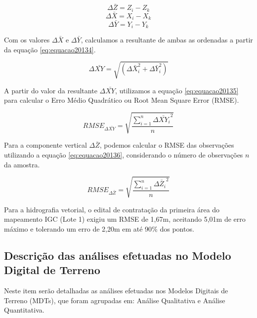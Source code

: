 \documentclass[12pt,a4paper]{article}
\begin{document}
		\begin{equation}
		\Delta  \bar{Z}=Z_{i}-Z_{k}
		\label{eq:equacao20131}
		\end{equation}
		\begin{equation}
		\Delta  \bar{X}=X_{i}-X_{k}
		\label{eq:equacao20132}
		\end{equation}
		\begin{equation}
		\Delta  \bar{Y}=Y_{i}-Y_{k}
		\label{eq:equacao20133}
		\end{equation}
		
		Com os valores $\Delta  \bar{X}$ e $\Delta  \bar{Y}$, calculamos a resultante de ambas as ordenadas a partir da equação \ref{eq:equacao20134}.
		
		
		\begin{equation}
		\Delta\bar{XY} =\sqrt {(\Delta  \bar X_{i}^2+ \Delta  \bar Y_{i}^2)}
		\label{eq:equacao20134}
		\end{equation}
		
		A partir do valor da resultante $\Delta\bar{XY}$, utilizamos a equação \ref{eq:equacao20135} para calcular o Erro Médio Quadrático ou Root Mean Square Error (RMSE).
		
		\begin{equation}
		RMSE_{\Delta\bar{XY}} =\sqrt {\frac{\sum\limits^{n}_{i=1}{\Delta\bar{XY}_{i}}^2}{n}}
		\label{eq:equacao20135}
		\end{equation}
		
		Para a componente vertical $\Delta  \bar{Z}$, podemos calcular o RMSE das observações utilizando a equação \ref{eq:equacao20136}, considerando o número de	observações $n$ da amostra.

		\begin{equation}
		RMSE_{\Delta\bar{Z}} =\sqrt {\frac{\sum\limits^{n}_{i=1}{\Delta\bar{Z}_{i}}^2}{n}}
		\label{eq:equacao20136}
		\end{equation}
		
		Para a hidrografia vetorial, o edital de contratação da primeira área do mapeamento IGC (Lote 1) exigiu um RMSE de 1,67m, aceitando 5,01m de erro máximo e tolerando um erro de 2,20m em até 90$\%$ dos pontos.
		
		\subsection{Descrição das análises efetuadas no Modelo Digital de Terreno}
		Neste item serão detalhadas as análises efetuadas nos Modelos Digitais de Terreno (MDTs), que foram agrupadas em: Análise Qualitativa e Análise Quantitativa.
\end{document}
